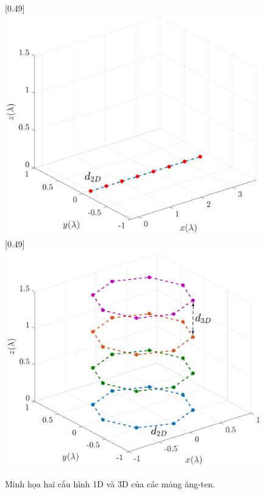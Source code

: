 \begin{figure}[ht]
    \centering
        [0.49\linewidth]
        {\includegraphics[width=\linewidth]{figures/ULA_2.pdf}}
    \hfill
        [0.49\linewidth]
        {\includegraphics[width=\linewidth]{figures/UCyA_2.pdf}}
    \caption{Minh họa hai cấu hình 1D và 3D của các mảng ăng-ten.}
    \label{fig:antenstruct}
\end{figure}

